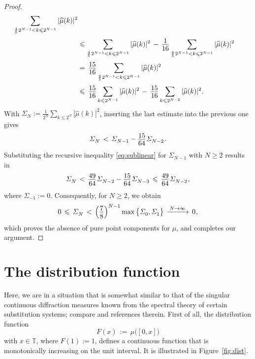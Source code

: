 \documentclass[11pt,a4paper]{amsart}
\theoremstyle{plain}
\theoremstyle{definition}
\numberwithin{equation}{section}
\newcommand{\ts}{\hspace{0.5pt}}
\newcommand{\TT}{\mathbb{T}}
\newcommand{\myfrac}[2]{\frac{\raisebox{-2pt}{$#1$}}
      {\raisebox{0.5pt}{$#2$}}}
\begin{document}
\begin{proof}
\begin{align*}
   \sum_{\frac{4}{5}\ts 2^{N-1}<k\leqslant 2^{N-1}}|\widehat{\mu} (k)|^2 \\[1mm]
  &\leqslant \sum_{\frac{4}{5}\ts 2^{N-1}<k\leqslant 2^{N-1}}
     |\widehat{\mu} (k)|^2 \, - \, \myfrac{1}{16}
    \sum_{\frac{4}{5}\ts 2^{N-1}<k\leqslant 2^{N-1}}|\widehat{\mu} (k)|^2 \\[1mm]
  &= \, \myfrac{15}{16}\sum_{\frac{4}{5}\ts 2^{N-1}<k\leqslant 2^{N-1}}
     |\widehat{\mu} (k)|^2\\[1mm]
  &\leqslant \, \myfrac{15}{16}\sum_{k\leqslant 2^{N-1}}
     |\widehat{\mu} (k)|^2 \, - \, \myfrac{15}{16}
    \sum_{k\leqslant 2^{N-2}}|\widehat{\mu} (k)|^2.
\end{align*}
With $\varSigma^{}_N := \tfrac{1}{2^N}\sum_{k\leqslant 2^N}|\widehat{\mu}
(k)|^2$, inserting the last estimate into the previous one gives
\begin{equation}\label{eq:sublinear}
  \varSigma^{}_N \, < \, \varSigma^{}_{N-1}
   -\myfrac{15}{64} \ts \varSigma^{}_{N-2} \ts .
\end{equation}
Substituting the recursive inequality \eqref{eq:sublinear} for
$\varSigma^{}_{N-1}$ with $N\geqslant 2$ results in
\begin{equation*}
   \varSigma^{}_N \, < \, \myfrac{49}{64}\ts 
   \varSigma^{}_{N-2} - \myfrac{15}{64}\ts \varSigma^{}_{N-3}
   \,\leqslant\, \myfrac{49}{64}\ts \varSigma^{}_{N-2} \ts ,
\end{equation*} 
where $\varSigma^{}_{-1}:=0$. Consequently, for $N\geqslant 2$, we
obtain
\[
   0 \, \leqslant \, \varSigma^{}_N \, < \, 
   \Bigl(\myfrac{7}{8}\Bigr)^{N-1} 
   \max \big\{ \varSigma^{}_0, \varSigma^{}_1 \big\} 
   \, \xrightarrow{\, N\to\infty\,} \, 0 \ts ,
\]
which proves the absence of pure point components for $\mu$,
and completes our argument.
\end{proof}



\section{The distribution function}

Here, we are in a situation that is somewhat similar to that of the
singular continuous diffraction measures known from the spectral
theory of certain substitution systems; compare \cite{squiral} and
references therein. First of all, the distribution function
\begin{equation}\label{eq:distmu}
    F(x) \, := \, \mu \bigl( [0,x] \bigr)
\end{equation}
with $x\in\TT$, where $F(1):= 1$, defines a continuous function
that is monotonically increasing on the unit interval. It is
illustrated in Figure~\ref{fig:dist}. 
\end{document}

